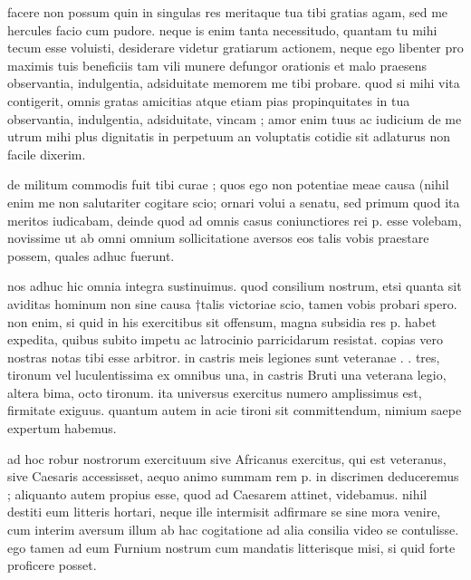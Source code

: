 


 facere non possum quin in singulas res meritaque tua tibi gratias agam, sed me hercules facio cum pudore. neque is enim tanta necessitudo, quantam tu mihi tecum esse voluisti, desiderare videtur gratiarum actionem, neque ego libenter pro maximis tuis beneficiis tam vili munere defungor orationis et malo praesens observantia, indulgentia, adsiduitate memorem me tibi probare. quod si mihi vita contigerit, omnis gratas amicitias atque etiam pias propinquitates in tua observantia, indulgentia, adsiduitate, vincam ; amor enim tuus ac iudicium de me utrum mihi plus dignitatis in perpetuum an voluptatis cotidie sit adlaturus non facile dixerim.

 de militum commodis fuit tibi curae ; quos ego non potentiae meae causa (nihil enim me non salutariter cogitare scio; ornari volui a senatu, sed primum quod ita meritos iudicabam, deinde quod ad omnis casus coniunctiores rei p. esse volebam, novissime ut ab omni omnium sollicitatione aversos eos talis vobis praestare possem, quales adhuc fuerunt.

 nos adhuc hic omnia integra sustinuimus. quod consilium nostrum, etsi quanta sit aviditas hominum non sine causa †talis victoriae scio, tamen vobis probari spero. non enim, si quid in his exercitibus sit offensum, magna subsidia res p. habet expedita, quibus subito impetu ac latrocinio parricidarum resistat. copias vero nostras notas tibi esse arbitror. in castris meis legiones sunt veteranae . . tres, tironum vel luculentissima ex omnibus una, in castris Bruti una veterana legio, altera bima, octo tironum. ita universus exercitus numero amplissimus est, firmitate exiguus. quantum autem in acie tironi sit committendum, nimium saepe expertum habemus.

 ad hoc robur nostrorum exercituum sive Africanus exercitus, qui est veteranus, sive Caesaris accessisset, aequo animo summam rem p. in discrimen deduceremus ; aliquanto autem propius esse, quod ad Caesarem attinet, videbamus. nihil destiti eum litteris hortari, neque ille intermisit adfirmare se sine mora venire, cum interim aversum illum ab hac cogitatione ad alia consilia video se contulisse. ego tamen ad eum Furnium nostrum cum mandatis litterisque misi, si quid forte proficere posset.

